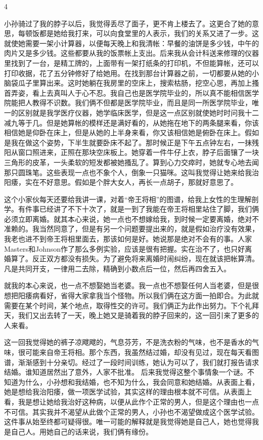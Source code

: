 4 

小孙骑过了我的脖子以后，我觉得丢尽了面子，更不肯上楼去了。这更合了她的意思，每顿饭都是她给我打来，可以向食堂里的人表示，我们的关系又进了一步。这就使她需要一架小计算器，以便每天晚上和我清帐：早餐的油饼是多少钱，中午的肉片又是多少钱。这些都要从我的饭票帐上支出。后来我从会计科送来修理的仪器里找到了一台，是精工牌的，上面带有一架打纸条的打印机，不但能算帐，还可以打印收据，花了五分钟修好了给她用。在找到那台计算器之前，一切都要从她的小脑袋瓜子里算出来。这时她躺在我房里的空床上，搜索枯肠，挖空心思，再加上搔首弄姿，看上去真叫人于心不忍。我自己也是医学院毕业的，所以真不能相信医学院能把人教得不识数。我们俩不但都是医学院毕业，而且是同一所医学院毕业，唯一的区别就是我学医疗仪器，她学临床医学，但是这一点区别就使她时时问我十二减九等于几。但是她算帐的模样还是满好看的，从她拖在地下的两条腿来看，你该相信她是仰卧在床上，但是从她的上半身来看，你又该相信她是俯卧在床上。假如是我在做这个姿势，下半生就要卧床不起了。那时候正是下午五点钟左右，一抹残阳从窗口照进来，正照在那块空床板上。她穿着一件牛仔上衣，脖子后面镶了一块三角形的皮革，一头柔软的短发都被她搔乱了。算到心力交瘁时，她就专心地去闻那只圆珠笔。这些表现一点也不象个人，倒象一只猫咪。这叫我觉得让她来给我治阳痿，实在不好意思。假如是个胖大女人，再长一点胡子，那就好意思了。 

这个小家伙每天还要给我讲一课，对着“帝王将相”的图谱，给我上女性的生理解剖学。有件事已经讲了不下十次了，就是一到了我能在帝王将相里站住了脚，我们俩必须立即离婚。就其本心来说，她一点也不想嫁给我，到时候一定要离婚，绝对不准赖的。我当然同意了，但是有另一个问题要提出来的，就是假如治疗没有效果，我老也进不到帝王将相里面去，那该如何是好。她说那是绝对不会有的事。人家Masters和Johnson作了那么多例实验，应该是很有把握。实在治不了，也只好离婚算了。反正双方都没有损失。为了避免将来离婚时闹纠纷，现在就该把帐算清。凡是共同开支，一律用二去除，精确到小数点后一位，然后再四舍五入。 

就我的本心来说，也一点不想娶她当老婆。我一点也不想娶任何人当老婆，但是很想把阳痿病看好，省得大家拿我当个怪物。所以我们俩在这方面一拍即合。为此就需要在某个时间，某个地点，取得性交的许可。我们俩正为此作出努力。下个礼拜天，我们又出去转了一天，晚上她又是骑着我的脖子回来的，这一回引来了更多的人来看。 

这一回我觉得她的裤子凉飕飕的，气息芬芳，不是洗衣粉的气味，也不是香水的气味，很可能来自帝王将相。那个东西，我虽然结过婚，却没有见过，现在每天看图谱，渐渐感到十分亲切。经过了一段时间训练，她认为可以了，我们就打报告请求结婚。谁知道居然出了意外，人家不批准。 后来我觉得这整个事情象一个谜。不知道为什么，小孙想和我结婚，也不知为什么，我会同意和她结婚。从表面上看，她是想给我治阳痿，做一项医学试验，其实这样的理由根本就不可信。从表面上看，我是想让她给我治好这种病，以便从此作个正常的男人，但是这个理由也一点不可信。其实我并不渴望从此做个正常的男人，小孙也不渴望做成这个医学试验。这件事从始至终都可疑得很。唯一可能的解释就是我觉得她是自己人，她也觉得我是自己人。用她自己的话来说，我们俩有缘份。

